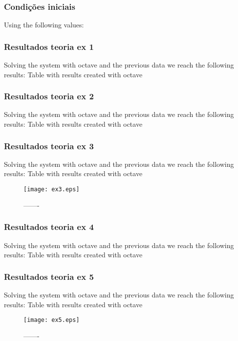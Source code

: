 \vspace{10mm}

\subsubsection{ Condições iniciais}

Using the following values:





\subsubsection{ Resultados teoria ex 1}

Solving the system with octave and the previous data we reach the following results:
 Table with results created with octave
 

 \subsubsection{ Resultados teoria ex 2}

Solving the system with octave and the previous data we reach the following results:
 Table with results created with octave
 

 \subsubsection{ Resultados teoria ex 3}

 Solving the system with octave and the previous data we reach the following results:
  Table with results created with octave

  \begin{figure}[H] \centering
    \texttt{[image: ex3.eps]}
    \caption{-------}
    \label{fig:ex3}
    \end{figure}


\subsubsection{ Resultados teoria ex 4}

    Solving the system with octave and the previous data we reach the following results:
     Table with results created with octave
     

\subsubsection{ Resultados teoria ex 5}

     Solving the system with octave and the previous data we reach the following results:
      Table with results created with octave
      \begin{figure}[H] \centering
        \texttt{[image: ex5.eps]}
        \caption{-------}
        \label{fig:ex5}
        \end{figure}